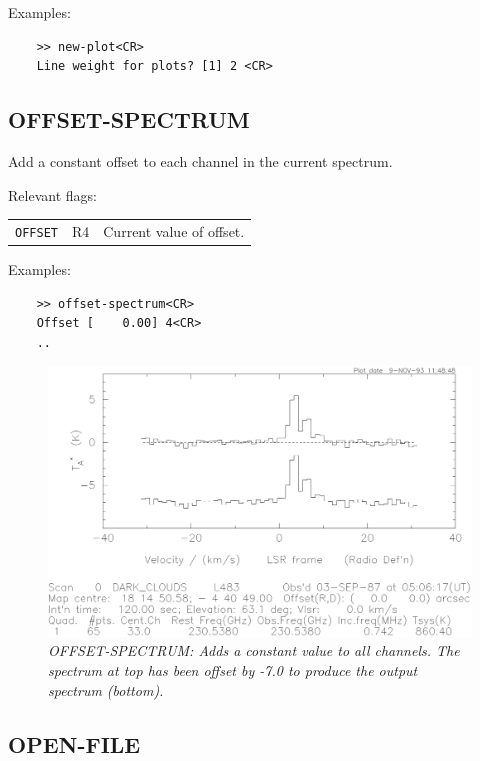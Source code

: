 \documentclass[11pt,twoside]{report}
\begin{document}
Examples:
\begin{verbatim}
    >> new-plot<CR>
    Line weight for plots? [1] 2 <CR>
\end{verbatim}

\subsection{OFFSET-SPECTRUM} 

Add a constant offset to each channel in the current spectrum.

Relevant flags:\\
\begin{tabular}{lll}
  \verb+OFFSET+ & R4 & Current value of offset.
\end{tabular}

Examples:
\begin{verbatim}
    >> offset-spectrum<CR>
    Offset [    0.00] 4<CR>
    ..
\end{verbatim}

\begin{figure}[htbp]
\begin{center}
\includegraphics[scale=0.65]{offset.ps}
\protect\parbox{5.5in}
{\caption[OFFSET]
{\sl
OFFSET-SPECTRUM: Adds a constant value to all channels. The spectrum at top
has been offset by -7.0 to produce the output spectrum (bottom).
\label{OFFSET}
}
}
\end{center}
\end{figure}

\subsection{OPEN-FILE} 
\end{document}
